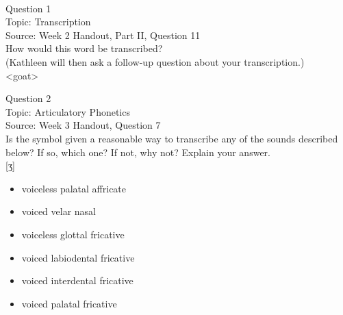 \documentclass[12pt]{article}
\begin{document}
\newpage

\begin{center}
\textbf{{\color{red}{\HUGE END OF EXAM}}}\\

\end{center}
\newpage

\begin{center}
\textbf{{\color{blue}{\HUGE START OF EXAM\\}}}

\textbf{{\color{blue}{\HUGE Student ID: 48894\\}}}

\textbf{{\color{blue}{\HUGE \\}}}

\end{center}
\newpage

{\large Question 1}\\

Topic: Transcription\\
Source: Week 2 Handout, Part II, Question 11\\

How would this word be transcribed?\\ (Kathleen will then ask a follow-up question about your transcription.)\\

<goat>


\newpage

{\large Question 2}\\

Topic: Articulatory Phonetics\\
Source: Week 3 Handout, Question 7\\

Is the symbol given a reasonable way to transcribe any of the sounds described below? If so, which one? If not, why not? Explain your answer.\\

{[ʒ]}

\begin{itemize} \item voiceless palatal affricate \item voiced velar nasal \item voiceless glottal fricative \item voiced labiodental fricative \item voiced interdental fricative \item voiced palatal fricative \end{itemize}
\end{document}
